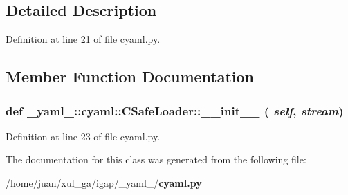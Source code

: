 \subsection{Detailed Description}


Definition at line 21 of file cyaml.py.

\subsection{Member Function Documentation}
\subsubsection{\setlength{\rightskip}{0pt plus 5cm}def \_\-yaml\_\-::cyaml::CSafeLoader::\_\-\_\-init\_\-\_\- ( {\em self},  {\em stream})}\label{class__yaml___1_1cyaml_1_1CSafeLoader_ba4627caff8a281dced3100e6a257c61}




Definition at line 23 of file cyaml.py.

The documentation for this class was generated from the following file:\begin{CompactItemize}
\item 
/home/juan/xul\_\-ga/igap/\_\-yaml\_\-/{\bf cyaml.py}\end{CompactItemize}
